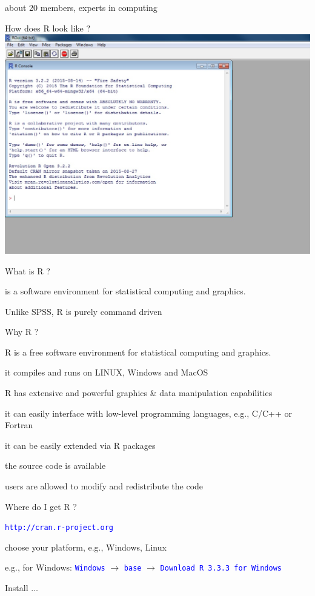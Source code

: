 \documentclass{presentatiesmetlogo}
\newcommand{\code}[1]{\textcolor{blue}{\texttt{#1}}}
\newcommand{\R}{{\textsf{R} }}
\let \nl = \newline
\begin{document}
about 20 members, experts in computing
\eitemt
\eitem
\bitem
\item How does \R look like ?
\eitem
\includegraphics[scale=0.7]{Figures/R.eps}

\bitem
\item What is \R ?
\bitemt
\item is a software environment for statistical computing and graphics.
\item Unlike SPSS, \R is purely command driven
\eitemt
\eitem
\bitem
\item Why \R ?
\bitemt
\item R is a free software environment for statistical
computing and graphics.
\item it compiles and runs on LINUX, Windows and MacOS
\item R has extensive and powerful graphics \& data manipulation
capabilities
\item it can easily interface with low-level programming
languages, e.g., C/C++ or Fortran
\item it can be easily extended via R packages
\item the source code is available
\item users are allowed to modify and redistribute the code
\eitemt
\eitem
\bitem
\item Where do I get \R ?
\bitemt
\item \code{http://cran.r-project.org}
\item choose your platform, e.g., Windows, Linux
\item e.g., for Windows: \code{Windows} $\rightarrow$ \code{base}
$\rightarrow$ \code{Download R 3.3.3 for Windows}
\item Install $\ldots$
\nl
\eitemt
\eitem
\end{document}
